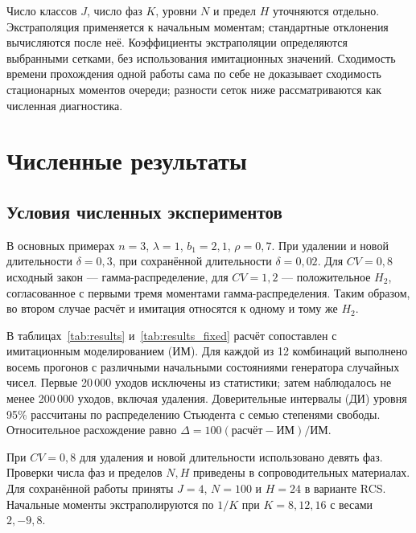 Число классов \(J\), число фаз \(K\), уровни \(N\) и предел \(H\) уточняются отдельно. Экстраполяция применяется к начальным моментам; стандартные отклонения вычисляются после неё. Коэффициенты экстраполяции определяются выбранными сетками, без использования имитационных значений. Сходимость времени прохождения одной работы сама по себе не доказывает сходимость стационарных моментов очереди; разности сеток ниже рассматриваются как численная диагностика.

\section{Численные результаты}\label{sec:results}
\subsection{Условия численных экспериментов}
В основных примерах \(n=3\), \(\lambda=1\), \(b_1=2{,}1\), \(\rho=0{,}7\). При удалении и новой длительности \(\delta=0{,}3\), при сохранённой длительности \(\delta=0{,}02\). Для \(CV=0{,}8\) исходный закон --- гамма-распределение, для \(CV=1{,}2\) --- положительное \(H_2\), согласованное с первыми тремя моментами гамма-распределения. Таким образом, во втором случае расчёт и имитация относятся к одному и тому же \(H_2\).

В таблицах~\ref{tab:results} и~\ref{tab:results_fixed} расчёт сопоставлен с имитационным моделированием (ИМ). Для каждой из 12 комбинаций выполнено восемь прогонов с различными начальными состояниями генератора случайных чисел. Первые 20\,000 уходов исключены из статистики; затем наблюдалось не менее 200\,000 уходов, включая удаления. Доверительные интервалы (ДИ) уровня 95\% рассчитаны по распределению Стьюдента с семью степенями свободы. Относительное расхождение равно \(\Delta=100(\text{расчёт}-\text{ИМ})/\text{ИМ}\).

При \(CV=0{,}8\) для удаления и новой длительности использовано девять фаз. Проверки числа фаз и пределов \(N,H\) приведены в сопроводительных материалах. Для сохранённой работы приняты \(J=4\), \(N=100\) и \(H=24\) в варианте RCS. Начальные моменты экстраполируются по \(1/K\) при \(K=8,12,16\) с весами \(2,-9,8\).

